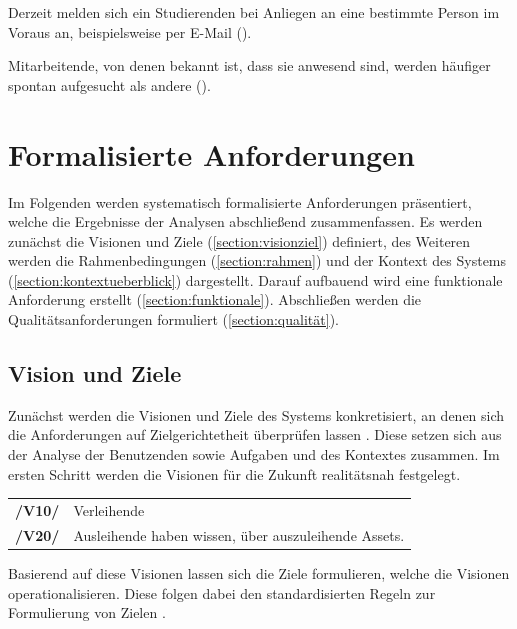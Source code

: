 Derzeit melden sich ein Studierenden bei Anliegen an eine bestimmte Person im
Voraus an, beispielsweise per E-Mail ().

Mitarbeitende, von denen bekannt ist, dass sie anwesend sind, werden häufiger
spontan aufgesucht als andere ().


\section{Formalisierte Anforderungen}
\label{section:anforderung}

Im Folgenden werden systematisch formalisierte Anforderungen präsentiert, welche
die Ergebnisse der Analysen abschließend zusammenfassen. Es werden zunächst die
Visionen und Ziele (\ref{section:visionziel}) definiert, des Weiteren werden die
Rahmenbedingungen (\ref{section:rahmen}) und der Kontext des Systems
(\ref{section:kontextueberblick}) dargestellt. Darauf aufbauend wird eine
funktionale Anforderung erstellt (\ref{section:funktionale}). Abschließen werden
die Qualitätsanforderungen formuliert (\ref{section:qualität}).


\subsection*{Vision und Ziele}
\label{section:visionziel}
Zunächst werden die Visionen und Ziele des Systems konkretisiert, an denen sich
die Anforderungen auf Zielgerichtetheit überprüfen lassen \cite{balzert2009}.
Diese setzen sich aus der Analyse der Benutzenden sowie Aufgaben und des
Kontextes zusammen. Im ersten Schritt werden die Visionen für die Zukunft
realitätsnah festgelegt.



\begin{center}
        \renewcommand{\arraystretch}{1.5}
        \begin{tabular}{p{}p{}}
                \hline
                \textbf{/V10/} & Verleihende
                \\
                \textbf{/V20/} & Ausleihende haben wissen, über auszuleihende
                Assets.                                                       \\
                \hline
        \end{tabular}
\end{center}

Basierend auf diese Visionen lassen sich die Ziele formulieren, welche die
Visionen operationalisieren. Diese folgen dabei den standardisierten Regeln zur
Formulierung von Zielen \cite{pohl_requirements_2008}.


